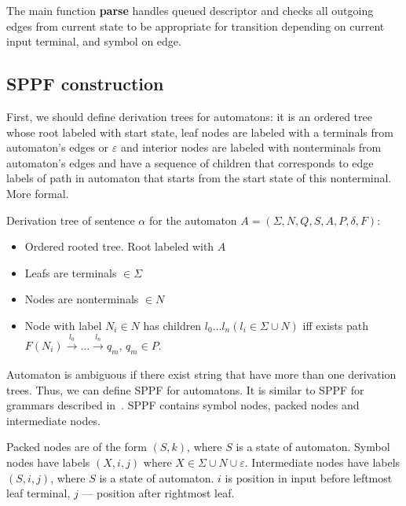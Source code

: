 \documentclass[runningheads,a4paper]{llncs}
\begin{document}
The main function \textbf{parse} handles queued descriptor and checks all outgoing edges from current state to be appropriate
for transition depending on current input terminal, and symbol on edge.


\subsection{SPPF construction}

First, we should define derivation trees for automatons: it is an ordered tree whose root labeled with start state,
leaf nodes are labeled with a terminals from automaton's edges or $\varepsilon$ and interior nodes are labeled with 
nonterminals from automaton's edges and have a sequence of children that corresponds to edge labels of path in 
automaton that starts from the start state of this nonterminal. More formal. 

\begin{mydef}

Derivation tree of sentence $\alpha$ for the automaton $A=(\Sigma, N, Q, S, A, P, \delta, F)$:%

\begin{itemize}
\item Ordered rooted tree. Root labeled with $A$
\item Leafs are terminals $\in \Sigma$
\item Nodes are nonterminals $\in N$
\item Node with label $N_i \in N$ has children $l_0 \dots l_n (l_i \in \Sigma \cup N)$ iff exists
path
$F(N_i) \xrightarrow[]{l_0} \dots \xrightarrow{l_n} q_m$, $q_m \in P$. 
\end{itemize}

\end{mydef}

Automaton is ambiguous if there exist string that have more than one derivation trees. Thus, we can define SPPF for automatons. 
It is similar to SPPF for grammars described in~\cite{scott2013gll}. SPPF contains symbol nodes, packed nodes
and intermediate nodes. 

Packed nodes are of the form $(S, k)$, where $S$ is a state of automaton. 
Symbol nodes have labels $(X, i, j)$ where $X \in \Sigma \cup N \cup \varepsilon$. 
Intermediate nodes have labels $ (S, i, j) $, where $S$ is a state of automaton. $i$ is position in input before leftmost leaf terminal, $j$ --- position after rightmost leaf.
\end{document}
